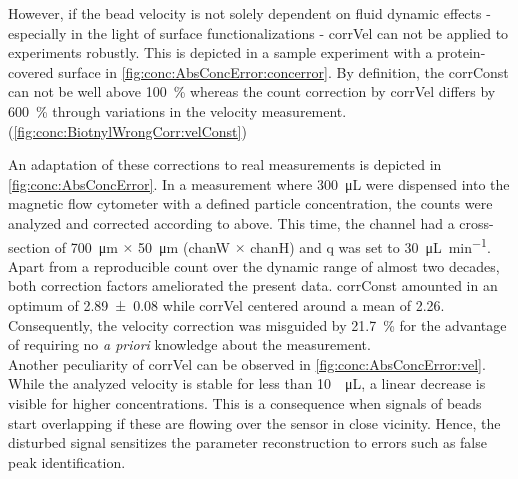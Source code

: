 \clearpage
However, if the bead velocity is not solely dependent on fluid dynamic effects - especially in the light of surface functionalizations - \gls{corrVel} can not be applied to experiments robustly. This is depicted in a sample experiment with a protein-covered surface in \cref{fig:conc:AbsConcError:concerror}. By definition, the \gls{corrConst} can not be well above \SI{100}{\percent} whereas the count correction by \gls{corrVel} differs by \SI{600}{\percent} through variations in the velocity measurement.(\cref{fig:conc:BiotnylWrongCorr:velConst})

An adaptation of these corrections to real measurements is depicted in \cref{fig:conc:AbsConcError}. In a measurement where \SI{300}{\micro\liter} were dispensed into the magnetic flow cytometer with a defined particle concentration, the counts were analyzed and corrected according to above. This time, the channel had a cross-section of \SI{700}{\micro\meter} $\times$ \SI{50}{\micro\meter} (\gls{chanW} $\times$ \gls{chanH}) and \gls{q} was set to \SI{30}{\micro\liter\per\minute}.\\
Apart from a reproducible count over the dynamic range of almost two decades, both correction factors ameliorated the present data. \gls{corrConst} amounted in an optimum of \linebreak \num{2,89 +- 0,08} while \gls{corrVel} centered around a mean of \num{2,26}. Consequently, the velocity correction was misguided by \SI{21.7}{\percent} for the advantage of requiring no \textit{a priori} knowledge about the measurement.\\
Another peculiarity of \gls{corrVel} can be observed in \cref{fig:conc:AbsConcError:vel}. While the analyzed velocity is stable for less than \SI{10}{\per\micro\liter}, a linear decrease is visible for higher concentrations. This is a consequence when signals of beads start overlapping if these are flowing over the sensor in close vicinity. Hence, the disturbed signal sensitizes the parameter reconstruction to errors such as false peak identification.
\clearpage
